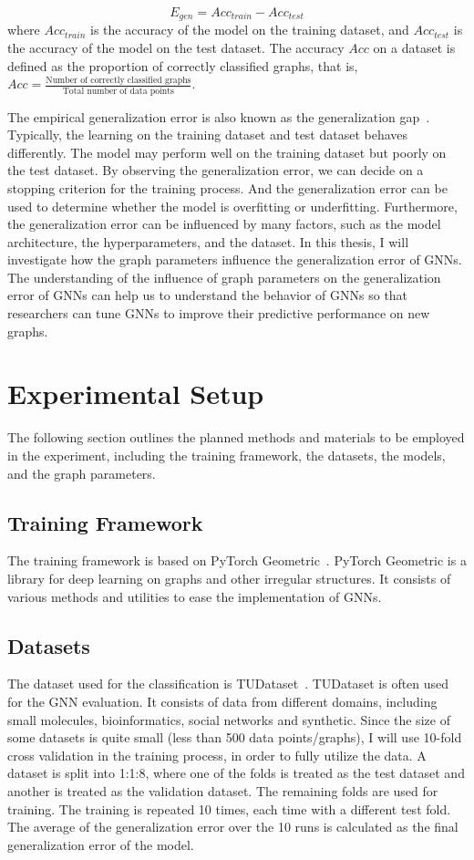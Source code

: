\documentclass{article}
\begin{document}
$$
    E_{gen} = {Acc_{train}} - {Acc_{test}}
$$
where $Acc_{train}$ is the accuracy of the model on the training dataset, and $Acc_{test}$ is the accuracy of the model on the test dataset. The accuracy $Acc$ on a dataset is defined as the proportion of correctly classified graphs, that is, $Acc = \frac{\text{Number of correctly classified graphs}}{\text{Total number of data points}}$.

The empirical generalization error is also known as the generalization gap~\cite{goodfellow2016deep}. Typically, the learning on the training dataset and test dataset behaves differently. The model may perform well on the training dataset but poorly on the test dataset. By observing the generalization error, we can decide on a stopping criterion for the training process. And the generalization error can be used to determine whether the model is overfitting or underfitting. Furthermore, the generalization error can be influenced by many factors, such as the model architecture, the hyperparameters, and the dataset. In this thesis, I will investigate how the graph parameters influence the generalization error of GNNs. The understanding of the influence of graph parameters on the generalization error of GNNs can help us to understand the behavior of GNNs so that researchers can tune GNNs to improve their predictive performance on new graphs.

\section{Experimental Setup}
The following section outlines the planned methods and materials to be employed in the experiment, including the training framework, the datasets, the models, and the graph parameters.

\subsection{Training Framework}
The training framework is based on PyTorch Geometric~\cite{fey2019fast}. PyTorch Geometric is a library for deep learning on graphs and other irregular structures. It consists of various methods and utilities to ease the implementation of GNNs. 

\subsection{Datasets}
The dataset used for the classification is TUDataset~\cite{morris2020tudataset}. TUDataset is often used for the GNN evaluation. It consists of data from different domains, including small molecules, bioinformatics, social networks and synthetic. Since the size of some datasets is quite small (less than 500 data points/graphs), I will use 10-fold cross validation in the training process, in order to fully utilize the data. A dataset is split into 1:1:8, where one of the folds is treated as the test dataset and another is treated as the validation dataset. The remaining folds are used for training. The training is repeated 10 times, each time with a different test fold. The average of the generalization error over the 10 runs is calculated as the final generalization error of the model. 
\end{document}
